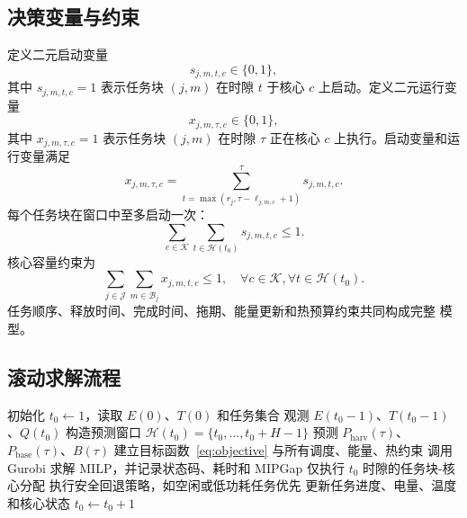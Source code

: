 \subsection{决策变量与约束}

定义二元启动变量
\begin{equation}
s_{j,m,t,c}\in\{0,1\},
\end{equation}
其中 $s_{j,m,t,c}=1$ 表示任务块 $(j,m)$ 在时隙 $t$ 于核心 $c$ 上启动。定义二元运行变量
\begin{equation}
x_{j,m,\tau,c}\in\{0,1\},
\end{equation}
其中 $x_{j,m,\tau,c}=1$ 表示任务块 $(j,m)$ 在时隙 $\tau$ 正在核心 $c$ 上执行。启动变量和运行变量满足
\begin{equation}
x_{j,m,\tau,c}=
\sum_{t=\max(r_j,\tau-\ell_{j,m,c}+1)}^\tau s_{j,m,t,c}.
\end{equation}
每个任务块在窗口中至多启动一次：
\begin{equation}
\sum_{c\in\mathcal{K}}\sum_{t\in\mathcal{H}(t_0)}s_{j,m,t,c}\le 1.
\end{equation}
核心容量约束为
\begin{equation}
\sum_{j\in\mathcal{J}}\sum_{m\in\mathcal{B}_j}x_{j,m,t,c}\le 1,\quad
\forall c\in\mathcal{K},\forall t\in\mathcal{H}(t_0).
\end{equation}
任务顺序、释放时间、完成时间、拖期、能量更新和热预算约束共同构成完整 \rhc{} 模型。

\subsection{滚动求解流程}

\begin{algorithm}[t]
\caption{\rhcfull{} 滚动调度流程}
\label{alg:rhc}
\begin{algorithmic}[1]
\State 初始化 $t_0\gets 1$，读取 $E(0)$、$T(0)$ 和任务集合
  \State 观测 $E(t_0-1)$、$T(t_0-1)$、$Q(t_0)$
  \State 构造预测窗口 $\mathcal{H}(t_0)=\{t_0,\dots,t_0+H-1\}$
  \State 预测 $P_{\mathrm{harv}}(\tau)$、$P_{\mathrm{base}}(\tau)$、$B(\tau)$
  \State 建立目标函数~\eqref{eq:objective} 与所有调度、能量、热约束
  \State 调用 Gurobi 求解 MILP，并记录状态码、耗时和 MIPGap
    \State 仅执行 $t_0$ 时隙的任务块-核心分配
  \Else
    \State 执行安全回退策略，如空闲或低功耗任务优先
  \EndIf
  \State 更新任务进度、电量、温度和核心状态
  \State $t_0\gets t_0+1$
\EndWhile
\end{algorithmic}
\end{algorithm}

